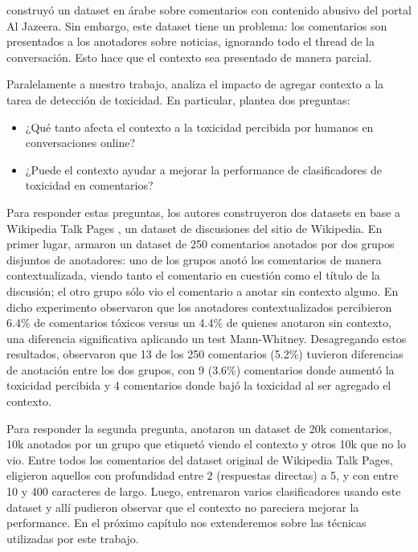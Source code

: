 \citet{mubarak-etal-2017-abusive} construyó un dataset en árabe sobre comentarios con contenido abusivo del portal Al Jazeera. Sin embargo, este dataset tiene un problema: los comentarios son presentados a los anotadores sobre noticias, ignorando todo el thread de la conversación. Esto hace que el contexto sea presentado de manera parcial.

Paralelamente a nuestro trabajo, \citet{pavlopoulos2020toxicity} analiza el impacto de agregar contexto a la tarea de detección de toxicidad. En particular, plantea dos preguntas:

\begin{itemize}
    \item ¿Qué tanto afecta el contexto a la toxicidad percibida por humanos en conversaciones online?
    \item ¿Puede el contexto ayudar a mejorar la performance de clasificadores de toxicidad en comentarios?
\end{itemize}

Para responder estas preguntas, los autores construyeron dos datasets en base a Wikipedia Talk Pages \cite{hua-etal-2018-wikiconv}, un dataset de discusiones del sitio de Wikipedia. En primer lugar, armaron un dataset de 250 comentarios anotados por dos grupos disjuntos de anotadores: uno de los grupos anotó los comentarios de manera contextualizada, viendo tanto el comentario en cuestión como el título de la discusión; el otro grupo sólo vio el comentario a anotar sin contexto alguno. En dicho experimento observaron que los anotadores contextualizados percibieron 6.4\% de comentarios tóxicos versus un 4.4\% de quienes anotaron sin contexto, una diferencia significativa aplicando un test Mann-Whitney. Desagregando estos resultados, observaron que 13 de los 250 comentarios (5.2\%) tuvieron diferencias de anotación entre los dos grupos, con 9 (3.6\%) comentarios donde aumentó la toxicidad percibida y 4 comentarios donde bajó la toxicidad al ser agregado el contexto.

Para responder la segunda pregunta, anotaron un dataset de 20k comentarios, 10k anotados por un grupo que etiquetó viendo el contexto y otros 10k que no lo vio. Entre todos los comentarios del dataset original de Wikipedia Talk Pages, eligieron aquellos con profundidad entre 2 (respuestas directas) a 5, y con entre 10 y 400 caracteres de largo. Luego, entrenaron varios clasificadores usando este dataset y allí pudieron observar que el contexto no pareciera mejorar la performance. En el próximo capítulo nos extenderemos sobre las técnicas utilizadas por este trabajo.

